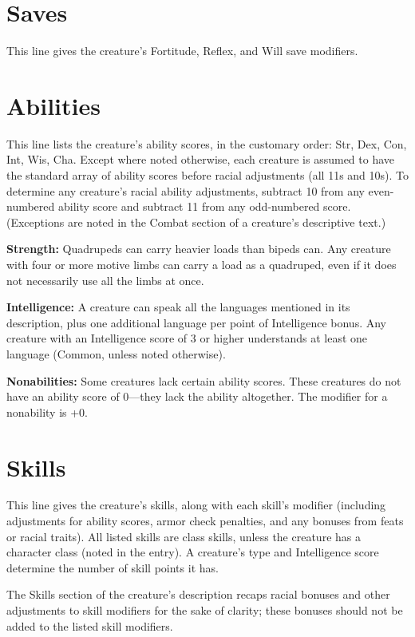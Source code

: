 \documentclass{article}
\begin{document}
\section*{\textbf{Saves}}

This line gives the creature's Fortitude, Reflex, and Will save modifiers.

\section*{\textbf{Abilities}}

This line lists the creature's ability scores, in the customary order: Str, Dex, 
Con, Int, Wis, Cha. Except where noted otherwise, each creature is assumed to have 
the standard array of ability scores before racial adjustments (all 11s and 10s). 
To determine any creature's racial ability adjustments, subtract 10 from any even-numbered 
ability score and subtract 11 from any odd-numbered score. (Exceptions are noted 
in the Combat section of a creature's descriptive text.) 

\textbf{Strength:} Quadrupeds can carry heavier loads than bipeds can. Any creature 
with four or more motive limbs can carry a load as a quadruped, even if it does 
not necessarily use all the limbs at once.

\textbf{Intelligence:} A creature can speak all the languages mentioned in its 
description, plus one additional language per point of Intelligence bonus. Any 
creature with an Intelligence score of 3 or higher understands at least one language 
(Common, unless noted otherwise).

\textbf{Nonabilities:} Some creatures lack certain ability scores. These creatures 
do not have an ability score of 0---they lack the ability altogether. The modifier 
for a nonability is +0. 

\section*{\textbf{Skills}}

This line gives the creature's skills, along with each skill's modifier (including 
adjustments for ability scores, armor check penalties, and any bonuses from feats 
or racial traits). All listed skills are class skills, unless the creature has 
a character class (noted in the entry). A creature's type and Intelligence score 
determine the number of skill points it has.

The Skills section of the creature's description recaps racial bonuses and other 
adjustments to skill modifiers for the sake of clarity; these bonuses should not 
be added to the listed skill modifiers.
\end{document}
